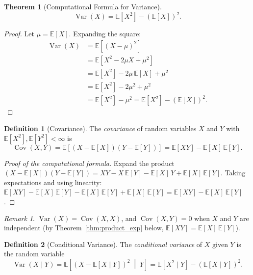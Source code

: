 \documentclass[11pt,a4paper]{article}
\theoremstyle{definition}
\newtheorem{definition}{Definition}[section]
\theoremstyle{plain}
\newtheorem{theorem}{Theorem}[section]
\theoremstyle{remark}
\newtheorem{remark}{Remark}[section]
\DeclareMathOperator{\Var}{Var}
\DeclareMathOperator{\Cov}{Cov}
\newcommand{\E}{\mathbb{E}}
\begin{document}
\begin{theorem}[Computational Formula for Variance]
\label{thm:var_formula}
\begin{equation}
    \Var(X) = \E[X^2] - (\E[X])^2.
    \label{eq:var_formula}
\end{equation}
\end{theorem}

\begin{proof}
Let $\mu = \E[X]$. Expanding the square:
\begin{align}
    \Var(X) &= \E[(X - \mu)^2] \nonumber\\
    &= \E[X^2 - 2\mu X + \mu^2] \nonumber\\
    &= \E[X^2] - 2\mu\,\E[X] + \mu^2 \tag{linearity} \\
    &= \E[X^2] - 2\mu^2 + \mu^2 \nonumber\\
    &= \E[X^2] - \mu^2 = \E[X^2] - (\E[X])^2. \label{eq:var_formula_proof}
\end{align}
\end{proof}

\begin{definition}[Covariance]
\label{def:covariance}
The \emph{covariance} of random variables $X$ and $Y$ with $\E[X^2], \E[Y^2] < \infty$ is
\begin{equation}
    \Cov(X, Y) = \E\!\left[(X - \E[X])(Y - \E[Y])\right] = \E[XY] - \E[X]\,\E[Y].
    \label{eq:covariance_def}
\end{equation}
\end{definition}

\begin{proof}[Proof of the computational formula]
Expand the product $(X - \E[X])(Y - \E[Y]) = XY - X\,\E[Y] - \E[X]\,Y + \E[X]\,\E[Y]$.
Taking expectations and using linearity:
$\E[XY] - \E[X]\,\E[Y] - \E[X]\,\E[Y] + \E[X]\,\E[Y] = \E[XY] - \E[X]\,\E[Y]$.
\end{proof}

\begin{remark}
$\Var(X) = \Cov(X, X)$, and $\Cov(X, Y) = 0$ when $X$ and $Y$ are independent (by Theorem~\ref{thm:product_exp} below, $\E[XY] = \E[X]\,\E[Y]$).
\end{remark}

\begin{definition}[Conditional Variance]
\label{def:cond_var}
The \emph{conditional variance} of $X$ given $Y$ is the random variable
\begin{equation}
    \Var(X \mid Y) = \E\!\left[(X - \E[X \mid Y])^2 \;\middle|\; Y\right] = \E[X^2 \mid Y] - (\E[X \mid Y])^2.
    \label{eq:cond_var}
\end{equation}
\end{definition}
\end{document}
